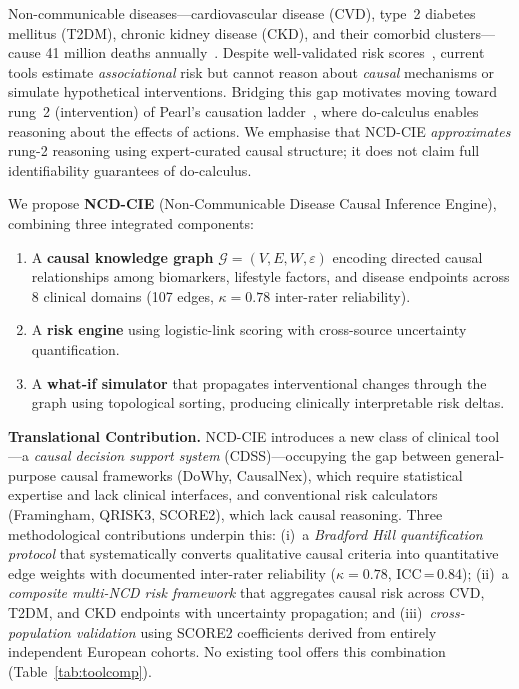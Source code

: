 \documentclass[runningheads]{llncs}
\begin{document}
Non-communicable diseases---cardiovascular disease (CVD), type~2
diabetes mellitus (T2DM), chronic kidney disease (CKD), and their
comorbid clusters---cause 41 million deaths
annually~\cite{who2021ncd}.
Despite well-validated risk scores~\cite{dagostino2008,hippisley2017qrisk3,score22021},
current tools estimate \emph{associational} risk but cannot reason about
\emph{causal} mechanisms or simulate hypothetical interventions.
Bridging this gap motivates moving toward rung~2 (intervention)
of Pearl's causation ladder~\cite{pearl2018book}, where
do-calculus enables reasoning about the effects of actions.
We emphasise that NCD-CIE \emph{approximates} rung-2 reasoning
using expert-curated causal structure; it does not claim full
identifiability guarantees of do-calculus.

We propose \textbf{NCD-CIE} (Non-Communicable Disease Causal Inference
Engine), combining three integrated components:
\begin{enumerate}
\item A \textbf{causal knowledge graph} $\mathcal{G}=(V,E,W,\varepsilon)$
  encoding directed causal relationships among biomarkers, lifestyle
  factors, and disease endpoints across 8 clinical domains
  (107 edges, $\kappa=0.78$ inter-rater reliability).
\item A \textbf{risk engine} using logistic-link scoring with
  cross-source uncertainty quantification.
\item A \textbf{what-if simulator} that propagates
  interventional changes through the graph using topological sorting,
  producing clinically interpretable risk deltas.
\end{enumerate}

\noindent\textbf{Translational Contribution.}
NCD-CIE introduces a new class of clinical tool---a \emph{causal
decision support system} (CDSS)---occupying the gap between
general-purpose causal frameworks (DoWhy, CausalNex), which require
statistical expertise and lack clinical interfaces, and
conventional risk calculators (Framingham, QRISK3, SCORE2), which
lack causal reasoning.
Three methodological contributions underpin this:
(i)~a \emph{Bradford Hill quantification protocol} that
systematically converts qualitative causal criteria into quantitative
edge weights with documented inter-rater reliability ($\kappa=0.78$,
ICC\,=\,0.84);
(ii)~a \emph{composite multi-NCD risk framework} that aggregates
causal risk across CVD, T2DM, and CKD endpoints with uncertainty
propagation; and
(iii)~\emph{cross-population validation} using SCORE2 coefficients
derived from entirely independent European cohorts.
No existing tool offers this combination (Table~\ref{tab:toolcomp}).
\end{document}
